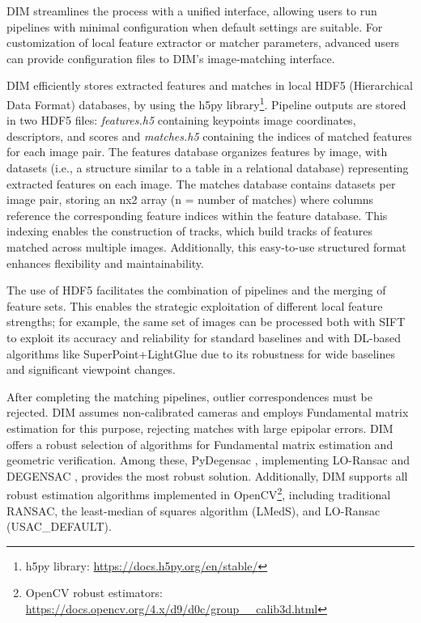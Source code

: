 DIM streamlines the process with a unified interface, allowing users to run pipelines with minimal configuration when default settings are suitable. 
For customization of local feature extractor or matcher parameters, advanced users can provide configuration files to DIM's image-matching interface.

DIM efficiently stores extracted features and matches in local HDF5 (Hierarchical Data Format) databases, by using the h5py library\footnote{h5py library: \url{https://docs.h5py.org/en/stable/}}. 
Pipeline outputs are stored in two HDF5 files: \textit{features.h5} containing keypoints image coordinates, descriptors, and scores and \textit{matches.h5} containing the indices of matched features for each image pair. 
The features database organizes features by image, with datasets (i.e., a structure similar to a table in a relational database) representing extracted features on each image. 
The matches database contains datasets per image pair, storing an nx2 array (n = number of matches) where columns reference the corresponding feature indices within the feature database. 
This indexing enables the construction of tracks, which build tracks of features matched across multiple images. 
Additionally, this easy-to-use structured format enhances flexibility and maintainability.

The use of HDF5 facilitates the combination of pipelines and the merging of feature sets. 
This enables the strategic exploitation of different local feature strengths; for example, the same set of images can be processed both with SIFT to exploit its accuracy and reliability for standard baselines and with DL-based algorithms like SuperPoint+LightGlue due to its robustness for wide baselines and significant viewpoint changes.

After completing the matching pipelines, outlier correspondences must be rejected. 
DIM assumes non-calibrated cameras and employs Fundamental matrix estimation for this purpose, rejecting matches with large epipolar errors. 
DIM offers a robust selection of algorithms for Fundamental matrix estimation and geometric verification. 
Among these, PyDegensac \cite{Mishkin2015_pydegensac}, implementing LO-Ransac \cite{Chum2003_loransac} and DEGENSAC \cite{Chum2005_degensac}, provides the most robust solution.  Additionally, DIM supports all robust estimation algorithms implemented in OpenCV\footnote{OpenCV robust estimators: \url{https://docs.opencv.org/4.x/d9/d0c/group__calib3d.html}}, including traditional RANSAC, the least-median of squares algorithm (LMedS), and LO-Ransac (USAC\_DEFAULT).

